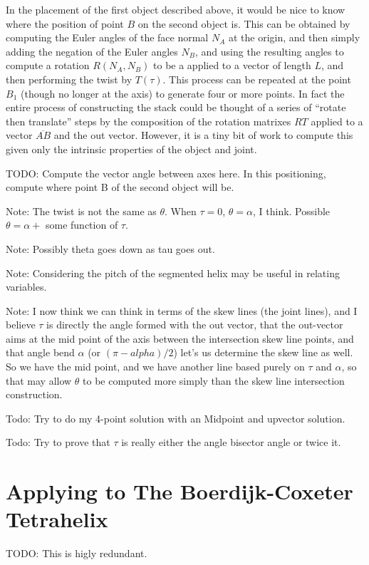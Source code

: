 \documentclass[11pt]{article}
\begin{document}
{In the placement of the first object described above, it would
be nice to know where the position of point $B$ on the second
object is. This can be obtained by computing the Euler angles
of the face normal $N_A$ at the origin, and then simply
adding the negation of the Euler angles $N_B$, and using
the resulting angles to compute a rotation $R(N_A,N_B)$ to be a applied to
a vector of length $L$, and then performing the twist by $T(\tau)$. This process can be repeated at
the point $B_1$ (though no longer at the axis) to generate
four or more points. In fact the entire process of constructing
the stack could be thought of a series of ``rotate then translate'' steps by the composition of the rotation matrixes $RT$ applied to a vector $\overline{AB}$ and the out vector.
However, it is a tiny bit of work to compute this given only
the intrinsic properties of the object and joint.

TODO: Compute the vector angle between axes here. In this positioning, compute where
point B of the second object will be.

Note: The twist is not the same as $\theta$. When $\tau = 0$, $\theta = \alpha$,
I think. Possible $\theta = \alpha + $ some function of $\tau$.

Note: Possibly theta goes down as tau goes out.

Note: Considering the pitch of the segmented helix may be useful
in relating variables.

Note: I now think we can think in terms of the skew lines (the
joint lines), and I believe $\tau$ is directly the angle
formed with the out vector, that the out-vector aims at
the mid point of the axis between the intersection skew line
points, and that angle bend $\alpha$ (or $(\pi - alpha)/2$)
let's us determine the skew line as well.  So we have
the mid point, and we have another line based purely
on $\tau$ and $\alpha$, so that may allow $\theta$
to be computed more simply than the skew line intersection
construction.

Todo: Try to do my 4-point solution with an Midpoint and
upvector solution.

Todo: Try to prove that $\tau$ is really either the
angle bisector angle or twice it.


\section{Applying to The Boerdijk-Coxeter Tetrahelix}

TODO: This is higly redundant.

}
\end{document}
